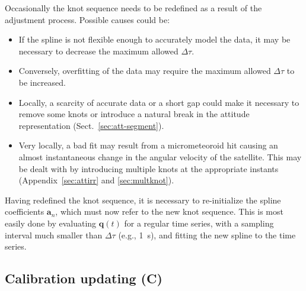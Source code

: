 \documentclass[structabstract]{aa}
\newcommand{\quat}[1]{\mathbf{#1}}
\begin{document}
Occasionally the knot sequence needs to be redefined as a result of
the adjustment process. Possible causes could be:
\begin{itemize}
\item
If the spline is not flexible enough to accurately model the data,
it may be necessary to decrease the maximum allowed $\Delta\tau$.
\item
Conversely, overfitting of the data may require the maximum allowed
$\Delta\tau$ to be increased.
\item
Locally, a scarcity of accurate data or a short gap could make it
necessary to remove some knots or introduce a natural break in
the attitude representation (Sect.~\ref{sec:att-segment}).
\item
Very locally, a bad fit may result from a micrometeoroid hit causing
an almost instantaneous change in the angular velocity of the satellite.
This may be dealt with by introducing multiple knots at the appropriate
instants (Appendix~\ref{sec:attirr} and \ref{sec:multknot}).
\end{itemize}
Having redefined the knot sequence, it is necessary to re-initialize
the spline coefficients $\quat{a}_n$, which must now refer to the
new knot sequence. This is most easily done by evaluating $\quat{q}(t)$
for a regular time series, with a sampling interval much smaller than
$\Delta\tau$ (e.g., 1~s), and fitting the new spline to the time
series.


\subsection{Calibration updating (C)} \label{sec:calupdate}
\end{document}

